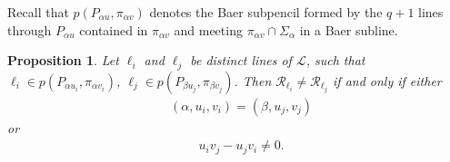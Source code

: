 \documentclass[11pt]{article}
\newtheorem{prop}[theorem]{Proposition}
\theoremstyle{definition}
\numberwithin{equation}{section}
\def\cI{\mathcal I}
\def\cL{\mathcal L}
\def\cU{\mathcal U}
\def\cR{\mathcal R}
\begin{document}
Recall that $p\left(P_{\alpha u}, \pi_{\alpha v}\right)$ denotes the Baer subpencil formed by the $q+1$ lines through $P_{\alpha u}$ contained in $\pi_{\alpha v}$ and meeting $\pi_{\alpha v} \cap \Sigma_{\alpha}$ in a Baer subline. %

\begin{prop}\label{mainp1}
Let $\ell_i$ and $\ell_{j}$ be distinct lines of $\cL$, such that $\ell_i \in p\left( P_{\alpha u_i}, \pi_{\alpha v_i} \right)$, $\ell_{j} \in p\left( P_{\beta u_{j}}, \pi_{\beta v_{j}} \right)$. 
Then $\cR_{\ell_{i}} \ne \cR_{\ell_{j}}$ if and only if either 
\begin{align*}
  & (\alpha, u_i, v_i) = (\beta, u_{j}, v_{j})  
\end{align*}
or
\begin{align*}
& u_{i} v_{j} - u_{j} v_{i} \ne 0. 
\end{align*}
\end{prop}
\end{document}
